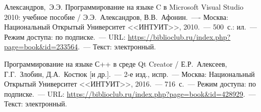 \documentclass[main.tex]{subfiles}
\begin{document}
\begin{thebibliography}{x}
     Александров,~Э.Э. Программирование на языке C в Microsoft Visual Studio 2010: учебное пособие / Э.Э.~Александров, В.В.~Афонин.~---- Москва: Национальный Открытый Университет <<ИНТУИТ>>, 2010.~--- 500~с.: ил.~--- Режим доступа: по подписке.~--- URL: \href{https://biblioclub.ru/index.php?page=book&id=233564}{https://biblioclub.ru/index.php?page=book\&id=233564}.~--- Текст: электронный.

     Программирование на языке С++ в среде Qt Creator / Е.Р.~Алексеев, Г.Г.~Злобин, Д.А.~Костюк [и др.].~--- 2-е изд., испр.~--- Москва: Национальный Открытый Университет <<ИНТУИТ>>, 2016.~--- 716~с.~--- Режим доступа: по подписке.~--- URL: \href{https://biblioclub.ru/index.php?page=book&id=428929}{https://biblioclub.ru/index.php?page=book\&id=428929}.~--- Текст: электронный.
\end{thebibliography}  
\end{document}
